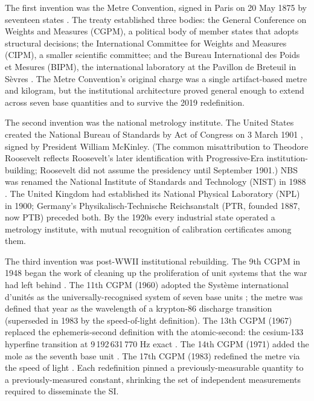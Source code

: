 The first invention was the Metre Convention, signed in Paris on
20 May 1875 by seventeen states
\cite{hist:ch03t3-metre-convention-1875}. The treaty established
three bodies: the General Conference on Weights and Measures
(CGPM), a political body of member states that adopts structural
decisions; the International Committee for Weights and Measures
(CIPM), a smaller scientific committee; and the Bureau
International des Poids et Mesures (BIPM), the international
laboratory at the Pavillon de Breteuil in S\`evres
\cite{web:ch03t3-bipm-about}. The Metre Convention's original
charge was a single artifact-based metre and kilogram, but the
institutional architecture proved general enough to extend across
seven base quantities and to survive the 2019 redefinition.

The second invention was the national metrology institute. The
United States created the National Bureau of Standards by Act of
Congress on 3 March 1901 \cite{hist:ch03t3-nbs-act-1901}, signed
by President William McKinley. (The common misattribution to
Theodore Roosevelt reflects Roosevelt's later identification with
Progressive-Era institution-building; Roosevelt did not assume the
presidency until September 1901.) NBS was renamed the National
Institute of Standards and Technology (NIST) in 1988
\cite{web:ch03t3-nist-history-overview}. The United Kingdom had
established its National Physical Laboratory (NPL) in 1900;
Germany's Physikalisch-Technische Reichsanstalt (PTR, founded
1887, now PTB) preceded both. By the 1920s every industrial state
operated a metrology institute, with mutual recognition of
calibration certificates among them.

The third invention was post-WWII institutional rebuilding. The 9th
CGPM in 1948 began the work of cleaning up the proliferation of
unit systems that the war had left behind
\cite{hist:ch03t3-cgpm-9th-1948}. The 11th CGPM (1960) adopted the
Syst\`eme international d'unit\'es as the universally-recognised
system of seven base units \cite{hist:ch03t3-cgpm-11th-1960}; the
metre was defined that year as the wavelength of a krypton-86
discharge transition (superseded in 1983 by the speed-of-light
definition). The 13th CGPM (1967) replaced the ephemeris-second
definition with the atomic-second: the cesium-133 hyperfine
transition at 9\,192\,631\,770 Hz exact
\cite{hist:ch03t3-cgpm-13th-1967, text:ch03t3-mccoubrey-1991}. The
14th CGPM (1971) added the mole as the seventh base unit
\cite{hist:ch03t3-cgpm-14th-1971-mole}. The 17th CGPM (1983)
redefined the metre via the speed of light
\cite{hist:ch03t3-cgpm-17th-1983-metre}. Each redefinition pinned
a previously-measurable quantity to a previously-measured constant,
shrinking the set of independent measurements required to disseminate
the SI.

